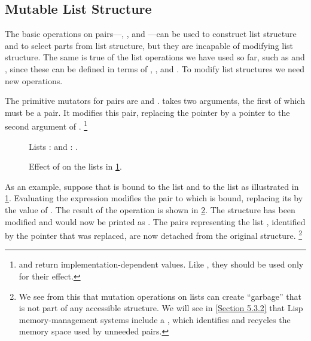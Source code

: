 \subsection{Mutable List Structure}
\label{Section 3.3.1}

The basic operations on pairs---, , and ---can be used to construct list structure and to select parts from list structure, but they are incapable of modifying list structure.
The same is true of the list operations we have used so far, such as  and , since these can be defined in terms of , , and .
To modify list structures we need new operations.

The primitive mutators for pairs are  and .
 takes two arguments, the first of which must be a pair.
It modifies this pair, replacing the  pointer by a pointer to the second argument of .%
\footnote{
	 and  return implementation-dependent values.
	Like , they should be used only for their effect.
}

\begin{figure}[tp]
	\centering
	
	\caption{
		Lists :  and : .
	}
	\label{Figure 3.12}
\end{figure}

\begin{figure}[bp]
	\centering
	
	\caption{
		Effect of  on the lists in \cref{Figure 3.12}.
	}
	\label{Figure 3.13}
\end{figure}

As an example, suppose that  is bound to the list  and  to the list  as illustrated in \cref{Figure 3.12}.
Evaluating the expression  modifies the pair to which  is bound, replacing its  by the value of .
The result of the operation is shown in \cref{Figure 3.13}.
The structure  has been modified and would now be printed as .
The pairs representing the list , identified by the pointer that was replaced, are now detached from the original structure.%
\footnote{
	We see from this that mutation operations on lists can create “garbage” that is not part of any accessible structure.
	We will see in \cref{Section 5.3.2} that Lisp memory-management systems include a , which identifies and recycles the memory space used by unneeded pairs.
}

